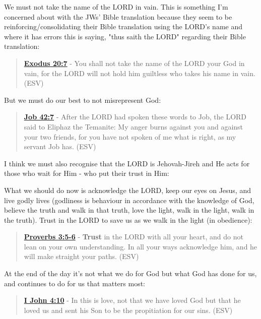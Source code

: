 \documentclass[11pt]{article}
\begin{document}
We must not take the name of the LORD in vain. This is something I'm concerned about with the JWs' Bible translation because they seem to be reinforcing/consolidating their Bible translation using the LORD's name and where it has errors this is saying, "thus saith the LORD" regarding their Bible translation:

\begin{quote}
\textbf{\href{https://www.biblegateway.com/passage/?search=Exodus\%2020\%3A7\&version=ESV}{Exodus 20:7}} - You shall not take the name of the LORD your God in vain, for the LORD will not hold him guiltless who takes his name in vain. (ESV)
\end{quote}

But we must do our best to not misrepresent God:

\begin{quote}
\textbf{\href{https://www.biblegateway.com/passage/?search=Job\%2042\%3A7\&version=ESV}{Job 42:7}} - After the LORD had spoken these words to Job, the LORD said to Eliphaz the Temanite: My anger burns against you and against your two friends, for you have not spoken of me what is right, as my servant Job has. (ESV)
\end{quote}

I think we must also recognise that the LORD is Jehovah-Jireh and He acts for those who wait for Him - who put their trust in Him:

What we should do now is acknowledge the LORD, keep our eyes on Jesus, and live godly lives (godliness is behaviour in accordance with the knowledge of God, believe the truth and walk in that truth, love the light, walk in the light, walk in the truth). Trust in the LORD to save us as we walk in the light (in obedience):

\begin{quote}
\textbf{\href{https://www.biblegateway.com/passage/?search=Proverbs\%203\%3A5-6\&version=ESV}{Proverbs 3:5-6}} - \textbf{Trust} in the LORD with all your heart, and do not lean on your own understanding. In all your ways acknowledge him, and he will make straight your paths. (ESV)
\end{quote}

At the end of the day it's not what we do for God but what God has done for us, and continues to do for us that matters most:

\begin{quote}
\textbf{\href{https://www.biblegateway.com/passage/?search=1\%20John\%204\%3A10\&version=ESV}{I John 4:10}} - In this is love, not that we have loved God but that he loved us and sent his Son to be the propitiation for our sins. (ESV)
\end{quote}
\end{document}
